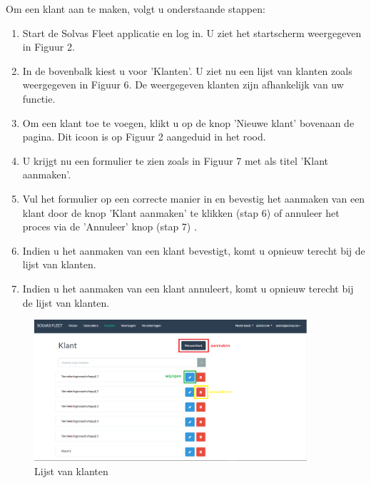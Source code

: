 \documentclass[11pt,openany]{article}
\begin{document}
Om een klant aan te maken, volgt u onderstaande stappen:
\begin{enumerate}
	\item Start de Solvas Fleet applicatie en log in. U ziet het startscherm weergegeven in Figuur 2.
	\item In de bovenbalk kiest u voor 'Klanten'. U ziet nu een lijst van klanten zoals weergegeven in Figuur 6. De weergegeven klanten zijn afhankelijk van uw functie.
	\item Om een klant toe te voegen, klikt u op de knop 'Nieuwe klant' bovenaan de pagina. Dit icoon is op Figuur 2 aangeduid in het rood.
	\item U krijgt nu een formulier te zien zoals	 in Figuur 7 met als titel 'Klant aanmaken'.
	\item Vul het formulier op een correcte manier in en bevestig het aanmaken van een klant door de knop 'Klant aanmaken' te klikken (stap 6) of annuleer het proces via de 'Annuleer' knop (stap 7) .
	\item Indien u het aanmaken van een klant bevestigt, komt u opnieuw terecht bij de lijst van klanten. 
	
	\item Indien u het aanmaken van een klant annuleert, komt u opnieuw terecht bij de lijst van 
	klanten.
\end{enumerate}
\begin{figure}
	\centering
	\includegraphics[width=0.9\textwidth]{img/fig_f.png}
	\caption{Lijst van klanten}
\end{figure}
\end{document}
